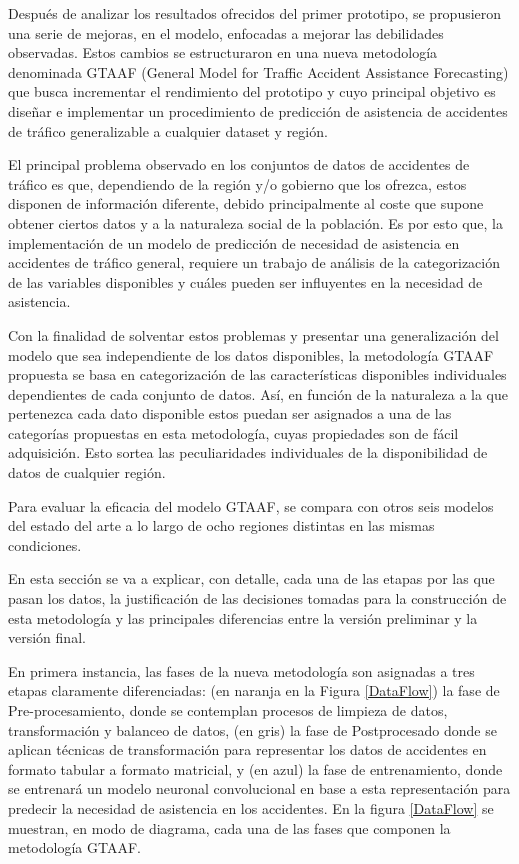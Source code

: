 \documentclass{uathesis-es}
\begin{document}
Después de analizar los resultados ofrecidos del primer prototipo, se propusieron una serie de mejoras, en el modelo, enfocadas a mejorar las debilidades observadas. Estos cambios se estructuraron en una nueva metodología denominada GTAAF (General Model for Traffic Accident Assistance Forecasting) que busca incrementar el rendimiento del prototipo y cuyo principal objetivo es diseñar e implementar un procedimiento de predicción de asistencia de accidentes de tráfico generalizable a cualquier dataset y región. 

El principal problema observado en los conjuntos de datos de accidentes de tráfico es que, dependiendo de la región y/o gobierno que los ofrezca, estos disponen de información diferente, debido principalmente al coste que supone obtener ciertos datos y a la naturaleza social de la población. Es por esto que, la implementación de un modelo de predicción de necesidad de asistencia en accidentes de tráfico general, requiere un trabajo de análisis de la categorización de las variables disponibles y cuáles pueden ser influyentes en la necesidad de asistencia.

Con la finalidad de solventar estos problemas y presentar una generalización del modelo que sea independiente de los datos disponibles, la metodología GTAAF propuesta se basa en categorización de las características disponibles individuales dependientes de cada conjunto de datos. Así, en función de la naturaleza a la que pertenezca cada dato disponible estos puedan ser asignados a una de las categorías propuestas en esta metodología, cuyas propiedades son de fácil adquisición. Esto sortea las peculiaridades individuales de la disponibilidad de datos de cualquier región. 

Para evaluar la eficacia del modelo GTAAF, se compara con otros seis modelos del estado del arte a lo largo de ocho regiones distintas en las mismas condiciones.

En esta sección se va a explicar, con detalle, cada una de las etapas por las que pasan los datos, la justificación de las decisiones tomadas para la construcción de esta metodología y las principales diferencias entre la versión preliminar y la versión final.

En primera instancia, las fases de la nueva metodología son asignadas a tres etapas claramente diferenciadas: (en naranja en la Figura \ref{DataFlow}) la fase de Pre-procesamiento, donde se contemplan procesos de limpieza de datos, transformación y balanceo de datos, (en gris) la fase de Postprocesado donde se aplican técnicas de transformación para representar los datos de accidentes en formato tabular a formato matricial, y (en azul) la fase de entrenamiento, donde se entrenará un modelo neuronal convolucional en base a esta representación para predecir la necesidad de asistencia en los accidentes. En la figura \ref{DataFlow} se muestran, en modo de diagrama, cada una de las fases que componen la metodología GTAAF.
\end{document}
